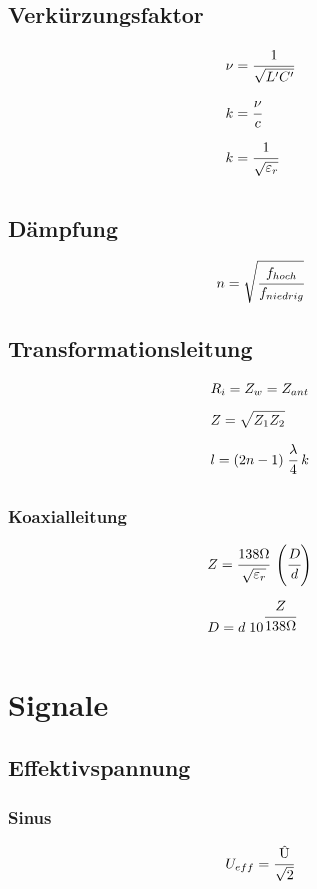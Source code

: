 \documentclass[12pt,a5paper,ngerman,titlepage]{article}
\begin{document}
\subsection{Verkürzungsfaktor}

\begin{align*}
&\nu = \cfrac{1}{\sqrt{L'C'}} \\[5pt]
&k = \cfrac{\nu}{c}  \\[5pt]
&k = \cfrac{1}{\sqrt{\varepsilon_{r}}}  \\[5pt]
\end{align*}

\subsection{Dämpfung}

$$n = \sqrt{\cfrac{f_{hoch}}{f_{niedrig}}}$$

\subsection{Transformationsleitung}
\begin{align*}
&R_{i} = Z_{w}=Z_{ant} \\[5pt]
&Z = \sqrt{Z_{1}Z_{2}}\\[5pt]
&l = (2n-1) \; \cfrac{\lambda}{4} \; k \\[5pt]
\end{align*}

\subsubsection{Koaxialleitung}
\begin{align*}
&Z=\cfrac{138\Omega}{\sqrt{\varepsilon_{r}}} \; \left( \cfrac{D}{d}\right) \\[5pt]
&D = d \; 10^{\cfrac{Z}{138\Omega}}\\[5pt]
\end{align*}

\newpage
\section{Signale}
\subsection{Effektivspannung}
\subsubsection{Sinus}
$$U_{eff}=\cfrac{\text{\^{U}}}{\sqrt{2}}$$
\end{document}
